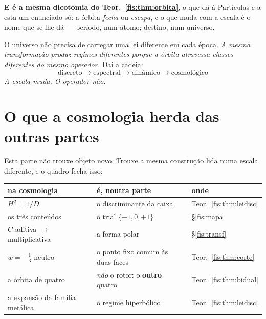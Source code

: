 \documentclass[livro.tex]{subfiles}
\begin{document}
\medskip\noindent\textbf{E é a mesma dicotomia do Teor.~\ref{fis:thm:orbita}}, o
que dá à Partículas e a esta um enunciado só: a órbita \emph{fecha} ou
\emph{escapa}, e o que muda com a escala é o nome que se lhe dá --- período, num
átomo; destino, num universo.

\medskip\noindent O universo não precisa de carregar uma lei diferente em cada
época. \emph{A mesma transformação produz regimes diferentes porque a órbita
atravessa classes diferentes do mesmo operador.} Daí a cadeia:
\[
\boxed{\;\text{discreto}\longrightarrow\text{espectral}
\longrightarrow\text{dinâmico}\longrightarrow\text{cosmológico}\;}
\]
\emph{A escala muda. O operador não.}

\section{O que a cosmologia herda das outras partes}\label{fis:cosmo-herda}

\noindent Esta parte não trouxe objeto novo. Trouxe a mesma construção lida numa
escala diferente, e o quadro fecha isso:

\begin{center}\small
\begin{tabular}{@{}lll@{}}
\toprule
na cosmologia & é, noutra parte & onde \\
\midrule
$H^{2}=1/D$ & o discriminante da caixa & Teor.~\ref{fis:thm:leidisc} \\
os três conteúdos & o trial $\{-1,0,+1\}$ & §\ref{fis:mapa} \\
$C$ aditiva $\to$ multiplicativa & a forma polar & §\ref{fis:transf} \\
$w=-\tfrac13$ neutro & o ponto fixo comum às duas faces & Teor.~\ref{fis:thm:corte} \\
a órbita de quatro & \emph{não} o rotor: o \textbf{outro} quatro & Teor.~\ref{fis:thm:bidual} \\
a expansão da família metálica & o regime hiperbólico & Teor.~\ref{fis:thm:leidisc} \\
\bottomrule
\end{tabular}
\end{center}
\end{document}
